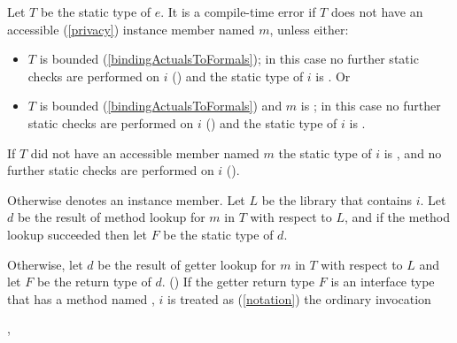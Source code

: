 \documentclass[makeidx]{article}
\begin{document}
{\LMHash{}%
Let $T$ be the static type of $e$.
It is a compile-time error if $T$ does not have an accessible
(\ref{privacy})
instance member named $m$, unless either:
\begin{itemize}
\item
  $T$ is \DYNAMIC{} bounded
  (\ref{bindingActualsToFormals});
  in this case no further static checks are performed on $i$
  ()
  and the static type of $i$ is \DYNAMIC.
  Or
\item
  $T$ is \FUNCTION{} bounded
  (\ref{bindingActualsToFormals})
  and $m$ is \CALL;
  in this case no further static checks are performed on $i$
  ()
  and the static type of $i$ is \DYNAMIC.
\end{itemize}

\LMHash{}%
If $T$ did not have an accessible member named $m$
the static type of $i$ is \DYNAMIC{},
and no further static checks are performed on $i$
().

\LMHash{}%
Otherwise  denotes an instance member.
Let $L$ be the library that contains $i$.
Let $d$ be the result of method lookup for $m$ in $T$ with respect to $L$,
and if the method lookup succeeded then let $F$ be the static type of $d$.

\LMHash{}%
Otherwise, let $d$ be the result of getter lookup for $m$ in $T$ with respect to $L$
and let $F$ be the return type of $d$.
()
If the getter return type $F$ is an interface type
that has a method named \CALL,
$i$ is treated as
(\ref{notation})
the ordinary invocation

\noindent
{},

}
\end{document}
